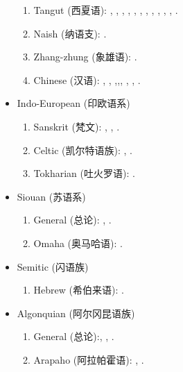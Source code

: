 \documentclass[oneside,a4paper,11pt]{article}
\newcommand{\zh}[1]{{\cn #1}}
\newcommand{\lingua}[3]{#1 (\zh{#3})}
\begin{document}
\begin{itemize}
\begin{enumerate}
\item \lingua{Tangut}{Tangoute}{西夏语}: \cite{jacques06comparaison},  \cite{jacques07textes}, \cite{jacques08weiyu}, \cite{jacques08alternations},   \cite{jacques09tangutverb},  \cite{jacques10imperial},  \cite{jacques11tangut.verb}, \cite{jacques11ngwemi}, \cite{jacques11kinship},  \cite{jacques14esquisse}, \cite{jacques14ergative}, \cite{jacques16th}.
\item \lingua{Naish}{Naish}{纳语支}: \cite{jacques.michaud11naish}.
\item  \lingua{Zhang-zhung}{Zhang-zhung}{象雄语}: \cite{jacques09zz}.
\item \lingua{Chinese}{Chinois}{汉语}:  \cite{jacques00ywij},  \cite{jacques03dissimilation},   \cite{jacques14honey},\cite{jacques15sr},\cite{jacques17genetic}, \cite{jacques17traditional}, \cite{jacques17buyang}, \cite{jacques16ssuffixes}.
\end{enumerate}
\item \lingua{Indo-European}{Indo-européen}{印欧语系}
\begin{enumerate}
\item \lingua{Sanskrit}{Sanskrit}{梵文}: \cite{jacques13vama}, \cite{jacques16camara}, \cite{jacques17hrd}.
\item \lingua{Celtic}{Celtique}{凯尔特语族}: \cite{michaud-jacques12nasalite}, \cite{jacques15cochon}.
\item \lingua{Tokharian}{Tocharien}{吐火罗语}: \cite{jacques14honey}.
\end{enumerate}
\item \lingua{Siouan}{Sioux}{苏语系}
\begin{enumerate}
\item \lingua{General}{Général}{总论}: \cite{jacques12bear}, \cite{michaud-jacques12nasalite}.  
\item \lingua{Omaha}{Omaha}{奥马哈语}: \cite{jacques16ebde}.
\end{enumerate}
\item \lingua{Semitic}{Sémitique}{闪语族}
\begin{enumerate}
\item \lingua{Hebrew}{Hébreu}{希伯来语}: \cite{rg-gj12yod}.
\end{enumerate}
\item \lingua{Algonquian}{Algonquien}{阿尔冈昆语族}
\begin{enumerate}
\item \lingua{General}{Général}{总论}:\cite{jacques12bear}, \cite{jacques14inverse}, \cite{jacques18directionality}.
\item \lingua{Arapaho}{Arapaho}{阿拉帕霍语}: \cite{jacques13arapaho}, \cite{jacques16phono.arapaho}.

\end{enumerate}
\end{itemize}
\end{document}
